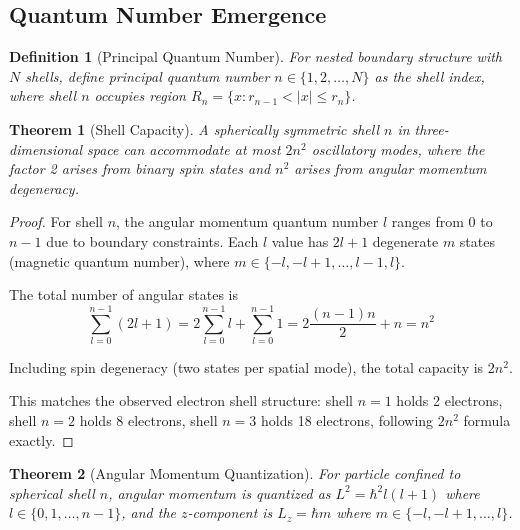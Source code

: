 \documentclass[twocolumn,10pt]{article}
\newtheorem{theorem}{Theorem}[section]
\newtheorem{definition}{Definition}[section]
\begin{document}
\subsection{Quantum Number Emergence}

\begin{definition}[Principal Quantum Number]
For nested boundary structure with $N$ shells, define principal quantum number $n \in \{1, 2, \ldots, N\}$ as the shell index, where shell $n$ occupies region $R_n = \{x : r_{n-1} < |x| \leq r_n\}$.
\end{definition}

\begin{theorem}[Shell Capacity]
\label{thm:shell_capacity}
A spherically symmetric shell $n$ in three-dimensional space can accommodate at most $2n^2$ oscillatory modes, where the factor 2 arises from binary spin states and $n^2$ arises from angular momentum degeneracy.
\end{theorem}

\begin{proof}
For shell $n$, the angular momentum quantum number $l$ ranges from $0$ to $n-1$ due to boundary constraints. Each $l$ value has $2l+1$ degenerate $m$ states (magnetic quantum number), where $m \in \{-l, -l+1, \ldots, l-1, l\}$.

The total number of angular states is
\begin{equation}
\sum_{l=0}^{n-1} (2l+1) = 2\sum_{l=0}^{n-1} l + \sum_{l=0}^{n-1} 1 = 2\frac{(n-1)n}{2} + n = n^2
\end{equation}

Including spin degeneracy (two states per spatial mode), the total capacity is $2n^2$.

This matches the observed electron shell structure: shell $n=1$ holds 2 electrons, shell $n=2$ holds 8 electrons, shell $n=3$ holds 18 electrons, following $2n^2$ formula exactly.
\end{proof}

\begin{theorem}[Angular Momentum Quantization]
\label{thm:angular_momentum}
For particle confined to spherical shell $n$, angular momentum is quantized as $L^2 = \hbar^2 l(l+1)$ where $l \in \{0, 1, \ldots, n-1\}$, and the $z$-component is $L_z = \hbar m$ where $m \in \{-l, -l+1, \ldots, l\}$.
\end{theorem}
\end{document}

